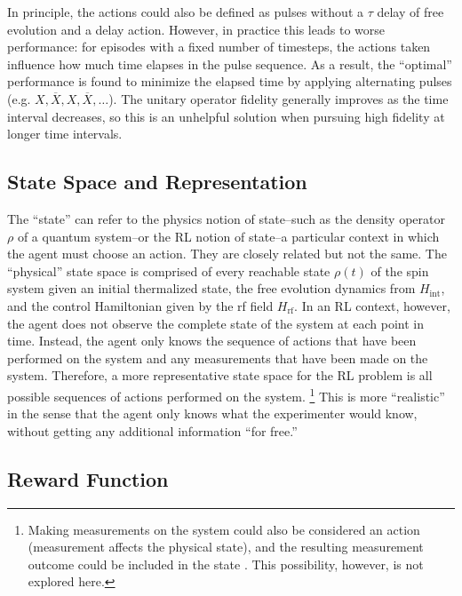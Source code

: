 In principle, the actions could also be defined as pulses without a $\tau$ delay of free evolution and a delay action. However, in practice this leads to worse performance: for episodes with a fixed number of timesteps, the actions taken influence how much time elapses in the pulse sequence. As a result, the ``optimal'' performance is found to minimize the elapsed time by applying alternating pulses (e.g. $X, \overline{X}, X, \overline{X}, \dots$).
The unitary operator fidelity generally improves as the time interval decreases, so this is an unhelpful solution when pursuing high fidelity at longer time intervals.

\subsection{State Space and Representation}

The ``state'' can refer to the physics notion of state--such as the density operator $\rho$ of a quantum system--or the RL notion of state--a particular context in which the agent must choose an action. They are closely related but not the same.
The ``physical'' state space is comprised of every reachable state $\rho(t)$ of the spin system given an initial thermalized state, the free evolution dynamics from $H_{\text{int}}$, and the control Hamiltonian given by the rf field $H_{\text{rf}}$.
In an RL context, however, the agent does not observe the complete state of the system at each point in time. Instead, the agent only knows the sequence of actions that have been performed on the system and any measurements that have been made on the system.
Therefore, a more representative state space for the RL problem is all possible sequences of actions performed on the system.%
\footnote{
Making measurements on the system could also be considered an action (measurement affects the physical state), and the resulting measurement outcome could be included in the state \cite{porotti2019coherent}. This possibility, however, is not explored here.
}
This is more ``realistic'' in the sense that the agent only knows what the experimenter would know, without getting any additional information ``for free.''

\subsection{Reward Function}

